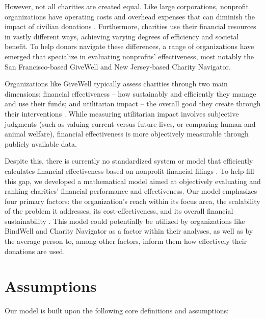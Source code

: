 \documentclass[12pt]{article}
\begin{document}
However, not all charities are created equal. Like large corporations, nonprofit organizations have operating costs and overhead expenses that can diminish the impact of civilian donations \cite{Gregory2009}. Furthermore, charities use their financial resources in vastly different ways, achieving varying degrees of efficiency and societal benefit. To help donors navigate these differences, a range of organizations have emerged that specialize in evaluating nonprofits' effectiveness, most notably the San Francisco-based GiveWell and New Jersey-based Charity Navigator.

Organizations like GiveWell typically assess charities through two main dimensions: financial effectiveness – how sustainably and efficiently they manage and use their funds; and utilitarian impact – the overall good they create through their interventions \cite{bowman2011}. While measuring utilitarian impact involves subjective judgments (such as valuing current versus future lives, or comparing human and animal welfare), financial effectiveness is more objectively measurable through publicly available data.

Despite this, there is currently no standardized system or model that efficiently calculates financial effectiveness based on nonprofit financial filings \cite{article}. To help fill this gap, we developed a mathematical model aimed at objectively evaluating and ranking charities' financial performance and effectiveness. Our model emphasizes four primary factors: the organization's reach within its focus area, the scalability of the problem it addresses, its cost-effectiveness, and its overall financial sustainability \cite{article}. This model could potentially be utilized by organizations like BindWell and Charity Navigator as a factor within their analyses, as well as by the average person to, among other factors, inform them how effectively their donations are used.

\section{Assumptions} %
Our model is built upon the following core definitions and assumptions:
\end{document}
